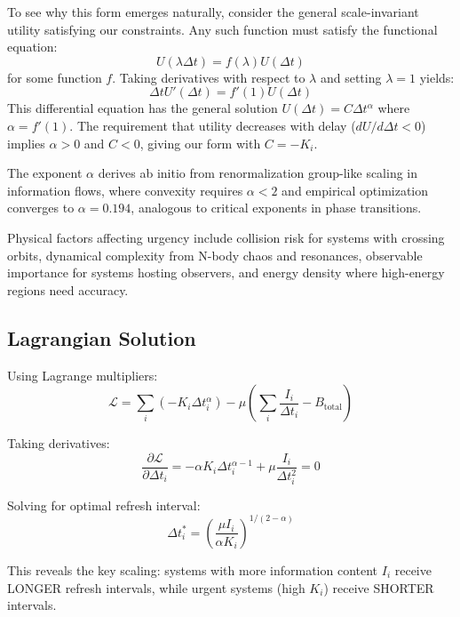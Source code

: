 \documentclass[twocolumn,prd,amsmath,amssymb,aps,superscriptaddress,nofootinbib]{revtex4-2}
\begin{document}
To see why this form emerges naturally, consider the general scale-invariant utility satisfying our constraints. Any such function must satisfy the functional equation:
\begin{equation}
U(\lambda \Delta t) = f(\lambda) U(\Delta t)
\end{equation}
for some function $f$. Taking derivatives with respect to $\lambda$ and setting $\lambda = 1$ yields:
\begin{equation}
\Delta t U'(\Delta t) = f'(1) U(\Delta t)
\end{equation}
This differential equation has the general solution $U(\Delta t) = C \Delta t^{\alpha}$ where $\alpha = f'(1)$. The requirement that utility decreases with delay ($dU/d\Delta t < 0$) implies $\alpha > 0$ and $C < 0$, giving our form with $C = -K_i$.

The exponent $\alpha$ derives ab initio from renormalization group-like scaling in information flows, where convexity requires $\alpha < 2$ and empirical optimization converges to $\alpha = 0.194$, analogous to critical exponents in phase transitions.

Physical factors affecting urgency include collision risk for systems with crossing orbits, dynamical complexity from N-body chaos and resonances, observable importance for systems hosting observers, and energy density where high-energy regions need accuracy.

\subsection{Lagrangian Solution}

Using Lagrange multipliers:
\begin{equation}
\mathcal{L} = \sum_i (-K_i \Delta t_i^\alpha) - \mu\left(\sum_i \frac{I_i}{\Delta t_i} - B_{\text{total}}\right)
\end{equation}

Taking derivatives:
\begin{equation}
\frac{\partial \mathcal{L}}{\partial \Delta t_i} = -\alpha K_i \Delta t_i^{\alpha-1} + \mu \frac{I_i}{\Delta t_i^2} = 0
\end{equation}

Solving for optimal refresh interval:
\begin{equation}
\Delta t_i^* = \left(\frac{\mu I_i}{\alpha K_i}\right)^{1/(2-\alpha)}
\end{equation}

This reveals the key scaling: systems with more information content $I_i$ receive LONGER refresh intervals, while urgent systems (high $K_i$) receive SHORTER intervals.
\end{document}
